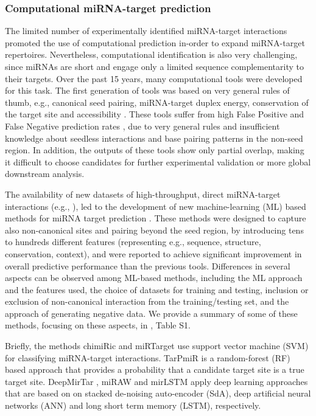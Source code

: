 \documentclass{bmcart}
\begin{document}
\subsubsection*{Computational miRNA-target prediction}
The limited number of experimentally identified miRNA-target interactions promoted the use of computational prediction in-order to expand miRNA-target repertoires. Nevertheless, computational identification is also very challenging, since miRNAs are short and engage only a limited sequence complementarity to their targets. 
Over the past 15 years, many computational tools were developed for this task. The first generation of tools was based on very general rules of thumb, e.g., canonical seed pairing, miRNA-target duplex energy, conservation of the target site and accessibility \cite{kruger2006rnahybrid, enright2003microrna, lewis2005conserved, kertesz2007role}. These tools suffer from high False Positive and False Negative prediction rates \cite{pinzon2017microrna, oliveira2017combining, fridrich2019too, min2010got}, due to very general rules and insufficient knowledge about seedless interactions and base pairing patterns in the non-seed region. In addition, the outputs of these tools show only partial overlap, making it difficult to choose candidates for further experimental validation or more global downstream analysis.

The availability of new datasets of high-throughput, direct miRNA-target interactions (e.g., \cite{scheel2017global, grosswendt2014unambiguous, darnell_moore2015mirna, helwak2013mapping}), led to the development of new machine-learning (ML) based methods for miRNA target prediction \cite{lu2016learning, ding2016tarpmir, pla2018miraw, wen2018deepmirtar, cheng2015mirtdl, menor2014mirmark}. These methods were designed to capture also non-canonical sites and pairing beyond the seed region, by introducing tens to hundreds different features (representing e.g., sequence, structure, conservation, context), and were reported to achieve significant improvement in overall predictive performance than the previous tools. Differences in several aspects can be observed among ML-based methods, including the ML approach and the features used, the choice of datasets for training and testing, inclusion or exclusion of non-canonical interaction from the training/testing set, and the approach of generating negative data. We provide a summary of some of these methods, focusing on these aspects, in , Table S1. 

Briefly, the methods chimiRic \cite{lu2016learning} and miRTarget \cite{wang2016improving,liu2019prediction} use support vector machine (SVM) for classifying miRNA-target interactions. TarPmiR \cite{ding2016tarpmir} is a random-forest (RF) based approach that provides a probability that a candidate target site is a true target site. DeepMirTar \cite{wen2018deepmirtar}, miRAW \cite{pla2018miraw}  and mirLSTM \cite{paker2019mirlstm} apply deep learning approaches that are based on on stacked de-noising auto-encoder (SdA), deep artificial neural networks (ANN) and long short term memory (LSTM), respectively.  
\end{document}
